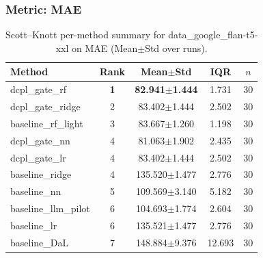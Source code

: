 \subsubsection*{Metric: MAE}
\begin{table}[H]
\centering
\scriptsize
\setlength{\tabcolsep}{4pt}
\renewcommand{\arraystretch}{1.1}
\caption{Scott--Knott per-method summary for data\_google\_flan-t5-xxl on MAE (Mean$\pm$Std over runs).}
\label{tab:sk_data_google_flan-t5-xxl_MAE}
\begin{tabular}{l|c|c|c|c}
\hline
\textbf{Method} & \textbf{Rank} & \textbf{Mean$\pm$Std} & \textbf{IQR} & \textbf{$n$} \\
\hline
\rowcolor{red!15} dcpl\_gate\_rf & \textbf{1} & \textbf{82.941$\pm$1.444} & 1.731 & 30 \\
dcpl\_gate\_ridge & 2 & 83.402$\pm$1.444 & 2.502 & 30 \\
baseline\_rf\_light & 3 & 83.667$\pm$1.260 & 1.198 & 30 \\
dcpl\_gate\_nn & 4 & 81.063$\pm$1.902 & 2.435 & 30 \\
dcpl\_gate\_lr & 4 & 83.402$\pm$1.444 & 2.502 & 30 \\
baseline\_ridge & 4 & 135.520$\pm$1.477 & 2.776 & 30 \\
baseline\_nn & 5 & 109.569$\pm$3.140 & 5.182 & 30 \\
baseline\_llm\_pilot & 6 & 104.693$\pm$1.774 & 2.604 & 30 \\
baseline\_lr & 6 & 135.521$\pm$1.477 & 2.776 & 30 \\
baseline\_DaL & 7 & 148.884$\pm$9.376 & 12.693 & 30 \\
\hline
\end{tabular}
\end{table}

